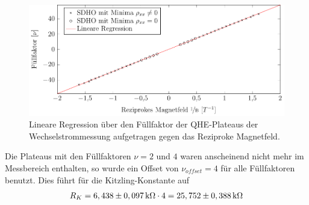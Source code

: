 \begin{figure}[h]
	\centering
	\includegraphics{graphs/ac/auswertung.pdf}
	\caption[Lineare Regression Wechselstrommessung]{
		Lineare Regression über den Füllfaktor der QHE-Plateaus der Wechselstrommessung aufgetragen gegen das Reziproke Magnetfeld.
	}
	\label{fig:ac_sdho_ausw}
\end{figure}

Die Plateaus mit den Füllfaktoren $\nu=2$ und $4$ waren anscheinend nicht mehr im Messbereich enthalten, so wurde ein Offset von $\nu_{offset}=4$ für alle Füllfaktoren benutzt. Dies führt für die Kitzling-Konstante auf
$$ R_K = \unit[6,438 \pm 0,097]{k \Omega} \cdot 4 = \unit[25,752\pm 0,388]{k \Omega} $$